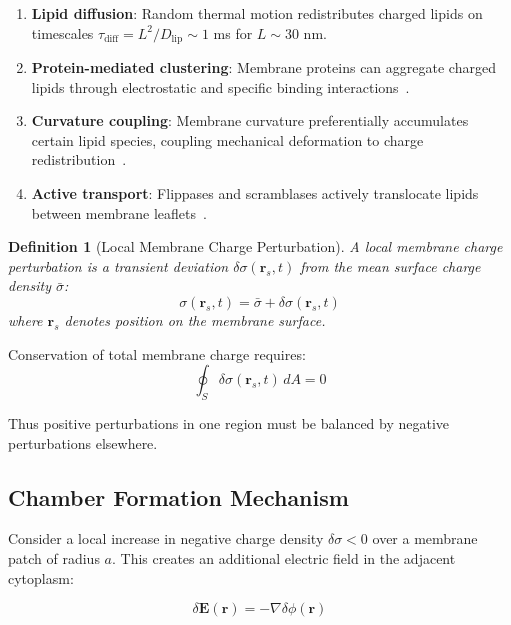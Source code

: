 \documentclass[twocolumn,10pt,aps,prd,superscriptaddress,floatfix,nofootinbib]{revtex4-2}
\newtheorem{definition}[theorem]{Definition}
\theoremstyle{remark}
\begin{document}
\begin{enumerate}
\item \textbf{Lipid diffusion}: Random thermal motion redistributes charged lipids on timescales $\tau_{\mathrm{diff}} = L^2/D_{\mathrm{lip}} \sim 1$ ms for $L \sim 30$ nm.

\item \textbf{Protein-mediated clustering}: Membrane proteins can aggregate charged lipids through electrostatic and specific binding interactions~\cite{McLaughlin2002}.

\item \textbf{Curvature coupling}: Membrane curvature preferentially accumulates certain lipid species, coupling mechanical deformation to charge redistribution~\cite{McMahon2005}.

\item \textbf{Active transport}: Flippases and scramblases actively translocate lipids between membrane leaflets~\cite{Devaux1991}.
\end{enumerate}

\begin{definition}[Local Membrane Charge Perturbation]
\label{def:charge_perturbation}
A local membrane charge perturbation is a transient deviation $\delta\sigma(\mathbf{r}_s, t)$ from the mean surface charge density $\bar{\sigma}$:
\begin{equation}
\sigma(\mathbf{r}_s, t) = \bar{\sigma} + \delta\sigma(\mathbf{r}_s, t)
\end{equation}
where $\mathbf{r}_s$ denotes position on the membrane surface.
\end{definition}

Conservation of total membrane charge requires:
\begin{equation}
\oint_S \delta\sigma(\mathbf{r}_s, t) \, dA = 0
\label{eq:charge_conservation}
\end{equation}

Thus positive perturbations in one region must be balanced by negative perturbations elsewhere.

\subsection{Chamber Formation Mechanism}

Consider a local increase in negative charge density $\delta\sigma < 0$ over a membrane patch of radius $a$. This creates an additional electric field in the adjacent cytoplasm:

\begin{equation}
\delta\mathbf{E}(\mathbf{r}) = -\nabla\delta\phi(\mathbf{r})
\end{equation}
\end{document}
